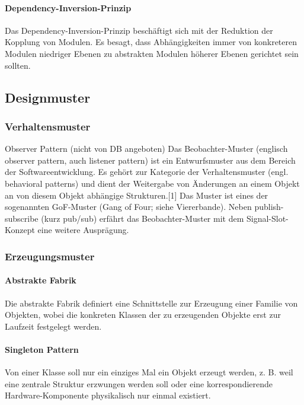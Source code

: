 \paragraph{Dependency-Inversion-Prinzip}
Das Dependency-Inversion-Prinzip beschäftigt sich mit der Reduktion der Kopplung von Modulen. Es besagt, dass Abhängigkeiten immer von konkreteren Modulen niedriger Ebenen zu abstrakten Modulen höherer Ebenen gerichtet sein sollten.


\subsection{Designmuster}

\subsubsection{Verhaltensmuster}
Observer Pattern (nicht von DB angeboten)
Das Beobachter-Muster (englisch observer pattern, auch listener pattern) ist ein Entwurfsmuster aus dem Bereich der Softwareentwicklung. Es gehört zur Kategorie der Verhaltensmuster (engl. behavioral patterns) und dient der Weitergabe von Änderungen an einem Objekt an von diesem Objekt abhängige Strukturen.[1] Das Muster ist eines der sogenannten GoF-Muster (Gang of Four; siehe Viererbande).
Neben publish-subscribe (kurz pub/sub) erfährt das Beobachter-Muster mit dem Signal-Slot-Konzept eine weitere Ausprägung. 

\subsubsection{Erzeugungsmuster}
\paragraph{Abstrakte Fabrik}
Die abstrakte Fabrik definiert eine Schnittstelle zur Erzeugung einer Familie von Objekten, wobei die konkreten Klassen der zu erzeugenden Objekte erst zur Laufzeit festgelegt werden.

\paragraph{Singleton Pattern}
Von einer Klasse soll nur ein einziges Mal ein Objekt erzeugt werden, z. B. weil eine zentrale Struktur erzwungen werden soll oder eine korrespondierende Hardware-Komponente physikalisch nur einmal existiert.


